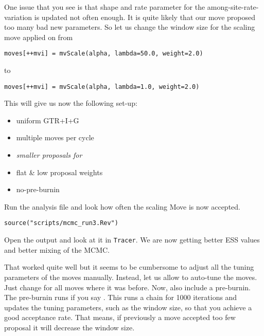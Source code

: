 One issue that you see is that shape and rate parameter  for the among-site-rate-variation is updated not often enough.
It is quite likely that our move proposed too many bad new parameters.
So let us change the window size for the scaling move applied on  from
{\tt \begin{snugshade*}
\begin{lstlisting}
moves[++mvi] = mvScale(alpha, lambda=50.0, weight=2.0)
\end{lstlisting}
\end{snugshade*}}
to
{\tt \begin{snugshade*}
\begin{lstlisting}
moves[++mvi] = mvScale(alpha, lambda=1.0, weight=2.0)
\end{lstlisting}
\end{snugshade*}}
This will give us now the following set-up:
\begin{itemize}
\item{uniform GTR+I+G}
\item{multiple moves per cycle}
\item{\it smaller proposals for }
\item{flat \& low proposal weights}
\item{no-pre-burnin}
\end{itemize}
Run the analysis file and look how often the scaling Move is now accepted.
{\tt \begin{snugshade*}
\begin{lstlisting}
source("scripts/mcmc_run3.Rev")
\end{lstlisting}
\end{snugshade*}}
Open the output and look at it in \verb!Tracer!.
We are now getting better ESS values and better mixing of the MCMC.

That worked quite well but it seems to be cumbersome to adjust all the tuning parameters of the moves manually.
Instead, let us allow \RevBayes to auto-tune the moves.
Just change  for all moves where it was  before.
Now, also include a pre-burnin.
The pre-burnin runs if you say .
This runs a chain for 1000 iterations and updates the tuning parameters, such as the window size, so that you achieve a good acceptance rate.
That means, if previously a move accepted too few proposal it will decrease the window size.

